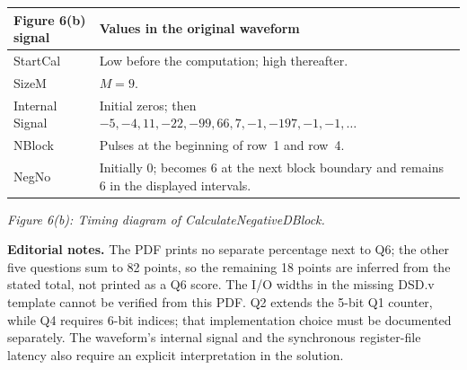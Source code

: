 \documentclass[11pt,a4paper]{article}
\begin{document}
\begin{center}
\begin{tabular}{lp{110mm}}
\toprule
Figure 6(b) signal & Values in the original waveform\\
\midrule
StartCal & Low before the computation; high thereafter.\\
SizeM & $M=9$.\\
Internal Signal & Initial zeros; then $-5,-4,11,-22,-99,66,7,-1,-197,-1,-1,\ldots$\\
NBlock & Pulses at the beginning of row~1 and row~4.\\
NegNo & Initially 0; becomes 6 at the next block boundary and remains 6 in the displayed intervals.\\
\bottomrule
\end{tabular}
\end{center}
\textit{Figure 6(b): Timing diagram of CalculateNegativeDBlock.}

\textbf{Editorial notes.} The PDF prints no separate percentage next to Q6; the other five questions sum to 82 points, so the remaining 18 points are inferred from the stated total, not printed as a Q6 score. The I/O widths in the missing DSD.v template cannot be verified from this PDF. Q2 extends the 5-bit Q1 counter, while Q4 requires 6-bit indices; that implementation choice must be documented separately. The waveform's internal signal and the synchronous register-file latency also require an explicit interpretation in the solution.
\end{document}
